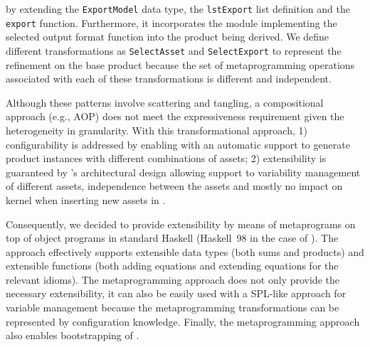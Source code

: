  by extending the \texttt{ExportModel} data type, the \texttt{lstExport} list definition and the \texttt{export} function. Furthermore, it incorporates the module implementing the selected output format function into the product being derived. We define different transformations as \texttt{SelectAsset} and \texttt{SelectExport} to represent the refinement on the base product because the set of metaprogramming operations associated with each of these \hpl{} transformations is different and independent.


Although these patterns involve scattering and tangling, a compositional approach (e.g., AOP) does not meet the expressiveness requirement given the heterogeneity in granularity. With this transformational approach, 1) configurability is addressed by enabling \hpl{} with an automatic support to generate product instances with different combinations of assets; 2) extensibility is guaranteed by \hpl{}'s architectural design allowing support to variability management of different assets, independence between the assets and mostly no impact on kernel when inserting new assets in \hpl.

Consequently, we decided to provide extensibility by means of
metaprograms on top of object programs in standard Haskell (Haskell~98
in the case of \hpl). The approach effectively supports extensible
data types (both sums and products) and extensible functions (both
adding equations and extending equations for the relevant idioms).
The metaprogramming approach does not only provide the necessary
extensibility, it can also be easily used with a SPL-like approach for
variable management because the metaprogramming transformations can be
represented by configuration knowledge. Finally, the
metaprogramming approach also enables bootstrapping of \hpl.